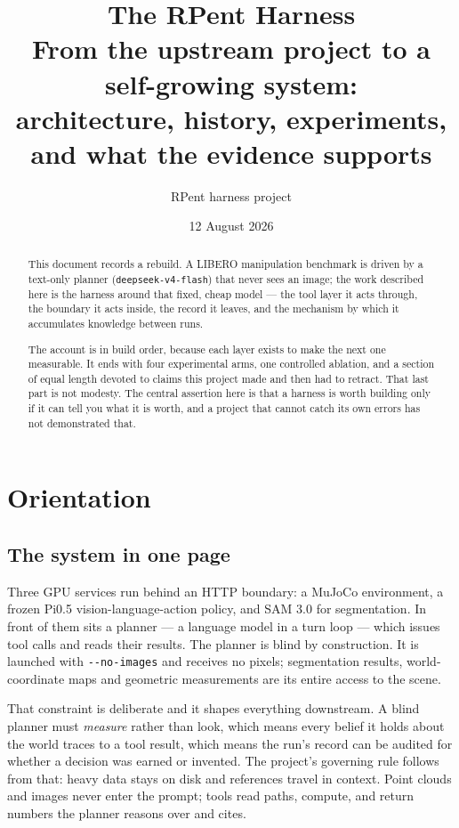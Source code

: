 \documentclass[11pt,a4paper]{report}
\title{\vspace{-2em}\textbf{The RPent Harness}\\[0.4em]
\large From the upstream project to a self-growing system:\\
architecture, history, experiments, and what the evidence supports}
\author{RPent harness project}
\date{12 August 2026}
\begin{document}
\maketitle

\begin{abstract}
\noindent
This document records a rebuild. A LIBERO manipulation benchmark is driven by a
text-only planner (\texttt{deepseek-v4-flash}) that never sees an image; the
work described here is the harness around that fixed, cheap model --- the tool
layer it acts through, the boundary it acts inside, the record it leaves, and
the mechanism by which it accumulates knowledge between runs.

The account is in build order, because each layer exists to make the next one
measurable. It ends with four experimental arms, one controlled ablation, and a
section of equal length devoted to claims this project made and then had to
retract. That last part is not modesty. The central assertion here is that a
harness is worth building only if it can tell you what it is worth, and a
project that cannot catch its own errors has not demonstrated that.
\end{abstract}

\tableofcontents

\chapter{Orientation}

\section{The system in one page}

Three GPU services run behind an HTTP boundary: a MuJoCo environment, a frozen
Pi0.5 vision-language-action policy, and SAM 3.0 for segmentation. In front of
them sits a planner --- a language model in a turn loop --- which issues tool
calls and reads their results. The planner is blind by construction. It is
launched with \texttt{-{}-no-images} and receives no pixels; segmentation
results, world-coordinate maps and geometric measurements are its entire access
to the scene.

That constraint is deliberate and it shapes everything downstream. A blind
planner must \emph{measure} rather than look, which means every belief it holds
about the world traces to a tool result, which means the run's record can be
audited for whether a decision was earned or invented. The project's governing
rule follows from that: heavy data stays on disk and references travel in
context. Point clouds and images never enter the prompt; tools read paths,
compute, and return numbers the planner reasons over and cites.
\end{document}
